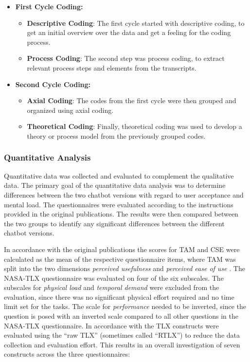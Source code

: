 \begin{itemize}
    \item \textbf{First Cycle Coding:}
    \begin{itemize}
        \item \textbf{Descriptive Coding}: The first cycle started with descriptive coding, to get an initial overview over the data and get a feeling for the coding process.
        \item \textbf{Process Coding}: The second step was process coding, to extract relevant process steps and elements from the transcripts.
    \end{itemize}
    \item \textbf{Second Cycle Coding:}
    \begin{itemize}
        \item \textbf{Axial Coding}: The codes from the first cycle were then grouped and organized using axial coding.
        \item \textbf{Theoretical Coding}: Finally, theoretical coding was used to develop a theory or process model from the previously grouped codes.
    \end{itemize}
\end{itemize}

\subsubsection{Quantitative Analysis} \label{sssec:quantitative_analysis}

Quantitative data was collected and evaluated to complement the qualitative data. The primary goal of the quantitative data analysis was to determine differences between the two chatbot versions with regard to user acceptance and mental load. The questionnaires were evaluated according to the instructions provided in the original publications. The results were then compared between the two groups to identify any significant differences between the different chatbot versions.

In accordance with the original publications the scores for TAM and CSE were calculated as the mean of the respective questionnaire items, where TAM was split into the two dimensions \textit{perceived usefulness} and \textit{perceived ease of use} \parencite{Davis1989,Compeau1995}. The \acs{NASA}-\ac{TLX} questionnaire was evaluated on four of the six subscales. The subscales for \textit{physical load} and \textit{temporal demand} were excluded from the evaluation, since there was no significant physical effort required and no time limit set for the tasks. The scale for \textit{performance} needed to be inverted, since the question is posed with an inverted scale compared to all other questions in the \acs{NASA}-\ac{TLX} questionnaire. In accordance with \cite{Hart2006} the \ac{TLX} constructs were evaluated using the “raw TLX” (sometimes called “RTLX”) to reduce the data collection and evaluation effort. This results in an overall investigation of seven constructs across the three questionnaires:

